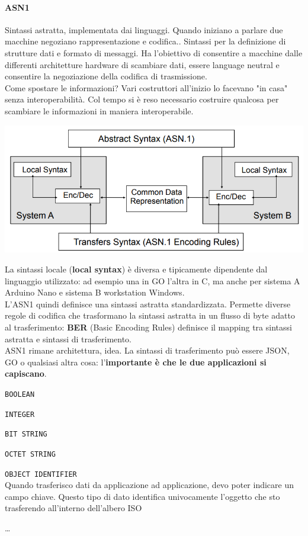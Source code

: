 \documentclass[10pt]{book}
\begin{document}
\paragraph{ASN1} Sintassi astratta, implementata dai linguaggi. Quando iniziano a parlare due macchine negoziano rappresentazione e codifica.. Sintassi per la definizione di strutture dati e formato di messaggi. Ha l'obiettivo di consentire a macchine dalle differenti architetture hardware di scambiare dati, essere language neutral e consentire la negoziazione della codifica di trasmissione.\\
Come spostare le informazioni? Vari costruttori all'inizio lo facevano "in casa" senza interoperabilità. Col tempo si è reso necessario costruire qualcosa per scambiare le informazioni in maniera interoperabile.
\pagebreak
\begin{center}
	\includegraphics[scale=0.7]{asn1.png}
\end{center}
La sintassi locale (\textbf{local syntax}) è diversa e tipicamente dipendente dal linguaggio utilizzato: ad esempio una in GO l'altra in C, ma anche per sistema A Arduino Nano e sistema B workstation Windows.\\
L'ASN1 quindi definisce una sintassi astratta standardizzata. Permette diverse regole di codifica che trasformano la sintassi astratta in un flusso di byte adatto al trasferimento: \textbf{BER} (Basic Encoding Rules) definisce il mapping tra sintassi astratta e sintassi di trasferimento.\\
ASN1 rimane architettura, idea. La sintassi di trasferimento può essere JSON, GO o qualsiasi altra cosa: l'\textbf{importante è che le due applicazioni si capiscano}.
\begin{list}{}{I \textbf{tipi di dato} (datatypes) primitivi dell'ASN1 sono:}
	\item \texttt{BOOLEAN}
	\item \texttt{INTEGER}
	\item \texttt{BIT STRING}
	\item \texttt{OCTET STRING}
	\item \texttt{OBJECT IDENTIFIER}\\
	Quando trasferisco dati da applicazione ad applicazione, devo poter indicare un campo chiave. Questo tipo di dato identifica univocamente l'oggetto che sto trasferendo all'interno dell'albero ISO
	\item \ldots
\end{list}
\end{document}
